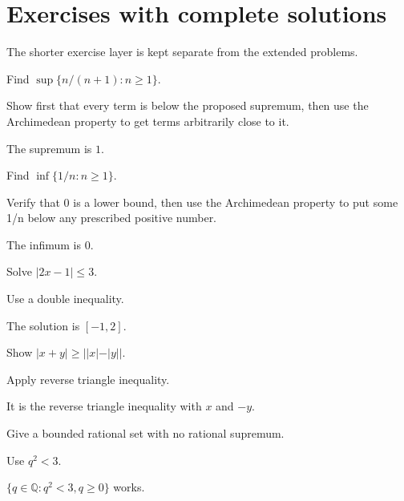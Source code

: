 \section{Exercises with complete solutions}
The shorter exercise layer is kept separate from the extended problems.

\begin{exercise}\label{exr:ii01-01}
Find $\sup\{n/(n+1):n\ge1\}$.
\end{exercise}
\begin{hint}
Show first that every term is below the proposed supremum, then use the Archimedean property to get terms arbitrarily close to it.
\end{hint}
\begin{solution}
The supremum is $1$.
\end{solution}

\begin{exercise}\label{exr:ii01-02}
Find $\inf\{1/n:n\ge1\}$.
\end{exercise}
\begin{hint}
Verify that 0 is a lower bound, then use the Archimedean property to put some 1/n below any prescribed positive number.
\end{hint}
\begin{solution}
The infimum is $0$.
\end{solution}

\begin{exercise}\label{exr:ii01-03}
Solve $|2x-1|\le3$.
\end{exercise}
\begin{hint}
Use a double inequality.
\end{hint}
\begin{solution}
The solution is $[-1,2]$.
\end{solution}

\begin{exercise}\label{exr:ii01-04}
Show $|x+y|\ge||x|-|y||$.
\end{exercise}
\begin{hint}
Apply reverse triangle inequality.
\end{hint}
\begin{solution}
It is the reverse triangle inequality with $x$ and $-y$.
\end{solution}

\begin{exercise}\label{exr:ii01-05}
Give a bounded rational set with no rational supremum.
\end{exercise}
\begin{hint}
Use $q^2<3$.
\end{hint}
\begin{solution}
$\{q\in\mathbb Q:q^2<3,q\ge0\}$ works.
\end{solution}

